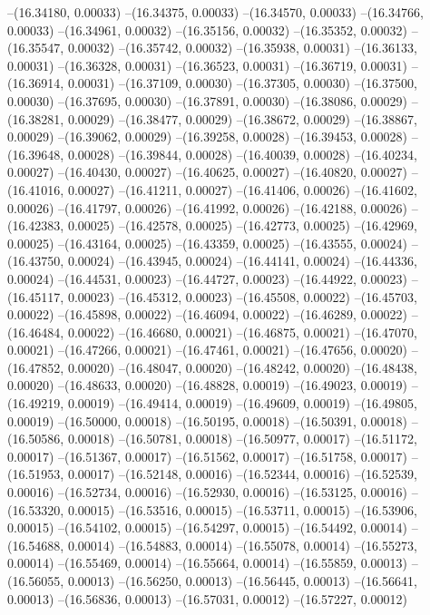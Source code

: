 --(16.34180, 0.00033)
--(16.34375, 0.00033)
--(16.34570, 0.00033)
--(16.34766, 0.00033)
--(16.34961, 0.00032)
--(16.35156, 0.00032)
--(16.35352, 0.00032)
--(16.35547, 0.00032)
--(16.35742, 0.00032)
--(16.35938, 0.00031)
--(16.36133, 0.00031)
--(16.36328, 0.00031)
--(16.36523, 0.00031)
--(16.36719, 0.00031)
--(16.36914, 0.00031)
--(16.37109, 0.00030)
--(16.37305, 0.00030)
--(16.37500, 0.00030)
--(16.37695, 0.00030)
--(16.37891, 0.00030)
--(16.38086, 0.00029)
--(16.38281, 0.00029)
--(16.38477, 0.00029)
--(16.38672, 0.00029)
--(16.38867, 0.00029)
--(16.39062, 0.00029)
--(16.39258, 0.00028)
--(16.39453, 0.00028)
--(16.39648, 0.00028)
--(16.39844, 0.00028)
--(16.40039, 0.00028)
--(16.40234, 0.00027)
--(16.40430, 0.00027)
--(16.40625, 0.00027)
--(16.40820, 0.00027)
--(16.41016, 0.00027)
--(16.41211, 0.00027)
--(16.41406, 0.00026)
--(16.41602, 0.00026)
--(16.41797, 0.00026)
--(16.41992, 0.00026)
--(16.42188, 0.00026)
--(16.42383, 0.00025)
--(16.42578, 0.00025)
--(16.42773, 0.00025)
--(16.42969, 0.00025)
--(16.43164, 0.00025)
--(16.43359, 0.00025)
--(16.43555, 0.00024)
--(16.43750, 0.00024)
--(16.43945, 0.00024)
--(16.44141, 0.00024)
--(16.44336, 0.00024)
--(16.44531, 0.00023)
--(16.44727, 0.00023)
--(16.44922, 0.00023)
--(16.45117, 0.00023)
--(16.45312, 0.00023)
--(16.45508, 0.00022)
--(16.45703, 0.00022)
--(16.45898, 0.00022)
--(16.46094, 0.00022)
--(16.46289, 0.00022)
--(16.46484, 0.00022)
--(16.46680, 0.00021)
--(16.46875, 0.00021)
--(16.47070, 0.00021)
--(16.47266, 0.00021)
--(16.47461, 0.00021)
--(16.47656, 0.00020)
--(16.47852, 0.00020)
--(16.48047, 0.00020)
--(16.48242, 0.00020)
--(16.48438, 0.00020)
--(16.48633, 0.00020)
--(16.48828, 0.00019)
--(16.49023, 0.00019)
--(16.49219, 0.00019)
--(16.49414, 0.00019)
--(16.49609, 0.00019)
--(16.49805, 0.00019)
--(16.50000, 0.00018)
--(16.50195, 0.00018)
--(16.50391, 0.00018)
--(16.50586, 0.00018)
--(16.50781, 0.00018)
--(16.50977, 0.00017)
--(16.51172, 0.00017)
--(16.51367, 0.00017)
--(16.51562, 0.00017)
--(16.51758, 0.00017)
--(16.51953, 0.00017)
--(16.52148, 0.00016)
--(16.52344, 0.00016)
--(16.52539, 0.00016)
--(16.52734, 0.00016)
--(16.52930, 0.00016)
--(16.53125, 0.00016)
--(16.53320, 0.00015)
--(16.53516, 0.00015)
--(16.53711, 0.00015)
--(16.53906, 0.00015)
--(16.54102, 0.00015)
--(16.54297, 0.00015)
--(16.54492, 0.00014)
--(16.54688, 0.00014)
--(16.54883, 0.00014)
--(16.55078, 0.00014)
--(16.55273, 0.00014)
--(16.55469, 0.00014)
--(16.55664, 0.00014)
--(16.55859, 0.00013)
--(16.56055, 0.00013)
--(16.56250, 0.00013)
--(16.56445, 0.00013)
--(16.56641, 0.00013)
--(16.56836, 0.00013)
--(16.57031, 0.00012)
--(16.57227, 0.00012)
